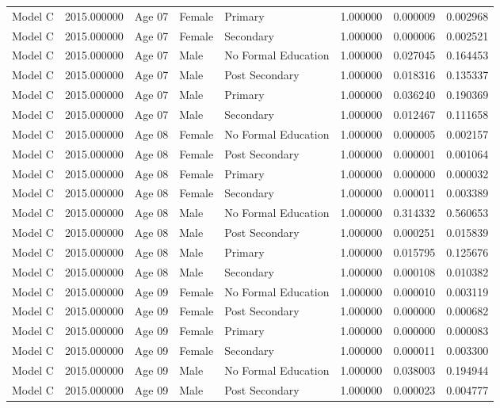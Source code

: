 \begin{table}[ht]
\begin{tabular}{lrlllrrr}
Model C & 2015.000000 & Age 07 & Female & Primary & 1.000000 & 0.000009 & 0.002968 \\
Model C & 2015.000000 & Age 07 & Female & Secondary & 1.000000 & 0.000006 & 0.002521 \\
Model C & 2015.000000 & Age 07 & Male & No Formal Education & 1.000000 & 0.027045 & 0.164453 \\
Model C & 2015.000000 & Age 07 & Male & Post Secondary & 1.000000 & 0.018316 & 0.135337 \\
Model C & 2015.000000 & Age 07 & Male & Primary & 1.000000 & 0.036240 & 0.190369 \\
Model C & 2015.000000 & Age 07 & Male & Secondary & 1.000000 & 0.012467 & 0.111658 \\
Model C & 2015.000000 & Age 08 & Female & No Formal Education & 1.000000 & 0.000005 & 0.002157 \\
Model C & 2015.000000 & Age 08 & Female & Post Secondary & 1.000000 & 0.000001 & 0.001064 \\
Model C & 2015.000000 & Age 08 & Female & Primary & 1.000000 & 0.000000 & 0.000032 \\
Model C & 2015.000000 & Age 08 & Female & Secondary & 1.000000 & 0.000011 & 0.003389 \\
Model C & 2015.000000 & Age 08 & Male & No Formal Education & 1.000000 & 0.314332 & 0.560653 \\
Model C & 2015.000000 & Age 08 & Male & Post Secondary & 1.000000 & 0.000251 & 0.015839 \\
Model C & 2015.000000 & Age 08 & Male & Primary & 1.000000 & 0.015795 & 0.125676 \\
Model C & 2015.000000 & Age 08 & Male & Secondary & 1.000000 & 0.000108 & 0.010382 \\
Model C & 2015.000000 & Age 09 & Female & No Formal Education & 1.000000 & 0.000010 & 0.003119 \\
Model C & 2015.000000 & Age 09 & Female & Post Secondary & 1.000000 & 0.000000 & 0.000682 \\
Model C & 2015.000000 & Age 09 & Female & Primary & 1.000000 & 0.000000 & 0.000083 \\
Model C & 2015.000000 & Age 09 & Female & Secondary & 1.000000 & 0.000011 & 0.003300 \\
Model C & 2015.000000 & Age 09 & Male & No Formal Education & 1.000000 & 0.038003 & 0.194944 \\
Model C & 2015.000000 & Age 09 & Male & Post Secondary & 1.000000 & 0.000023 & 0.004777 \\

\end{tabular}
\end{table}
